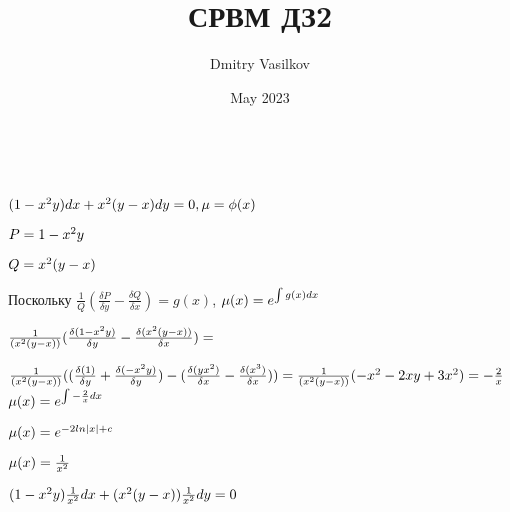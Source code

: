 \documentclass{article}
\title{СРВМ ДЗ2}
\author{Dmitry Vasilkov}
\date{May 2023}
\begin{document}
\maketitle

\begin{center}
\end{center}

\begin{center}
    {
    \\
    }
\end{center}


\begin{center}
    {$
    (1 - x^2y)dx + x^2(y - x)dy = 0,   \mu = \phi(x)\\
    $}
    
    {
    $P = 1 - x^2y\\$
    }

    {
    $Q = x^2(y - x)\\$
    }
    
    \text
    {
    Поскольку $\frac{1}{Q}(\frac{\delta P}{\delta y} - \frac{\delta Q}{\delta x}) = g(x)$, 
    $\mu (x) = e^{\int g(x)dx}\\$
    }

    {
    $\frac{1}{(x^2(y - x))}(\frac{\delta (1 - x^2y)}{\delta y} - \frac{\delta (x^2(y - x))}{\delta x}) = \\$
    }
    
    {$\frac{1}{(x^2(y - x))}((\frac{\delta (1)}{\delta y} + \frac{\delta (- x^2y)}{\delta y}) - (\frac{\delta (yx^2)}{\delta x} - \frac{\delta (x^3)}{\delta x})) = \frac{1}{(x^2(y - x))}(-x^2 - 2xy + 3x^2) = -\frac{2}{x}\\$
    }\\
    {
    $
    \mu (x) = e^{\int - \frac{2}{x}dx}\\
    $
    }

    {
    $
    \mu (x) = e^{-2ln|x| + c}\\
    $
    }

    {
    $
    \mu (x) = \frac{1}{x^2}\\
    $
    }

    {
    $
    (1 - x^2y)\frac{1}{x^2}dx + (x^2(y - x))\frac{1}{x^2}dy = 0\\
    $
    }


\end{center}
\end{document}
